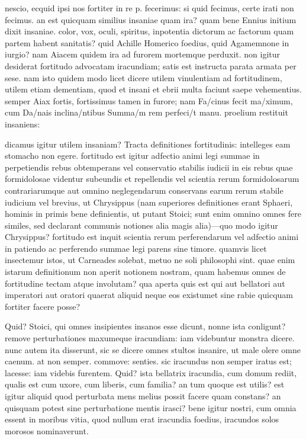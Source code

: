  nescio, ecquid ipsi nos fortiter in re p. fecerimus: si quid fecimus, certe irati non fecimus. an est quicquam similius insaniae quam ira? quam bene Ennius initium dixit insaniae. color, vox, oculi, spiritus, inpotentia dictorum ac factorum quam partem habent sanitatis? quid Achille Homerico foedius, quid Agamemnone in iurgio? nam Aiacem quidem ira ad furorem mortemque perduxit. non igitur desiderat fortitudo advocatam iracundiam; satis est instructa parata armata per sese. nam isto quidem modo licet dicere utilem vinulentiam ad fortitudinem, utilem etiam dementiam, quod et insani et ebrii multa faciunt saepe vehementius. semper Aiax fortis, fortissimus tamen in furore; nam Fa/cinus fecit ma/ximum, cum Da/nais inclina/ntibus Summa/m rem perfeci/t manu. proelium restituit insaniens:

 dicamus igitur utilem insaniam? Tracta definitiones fortitudinis: intelleges eam stomacho non egere. fortitudo est igitur adfectio animi legi summae in perpetiendis rebus obtemperans vel conservatio stabilis iudicii in eis rebus quae formidolosae videntur subeundis et repellendis vel scientia rerum formidolosarum contrariarumque aut omnino neglegendarum conservans earum rerum stabile iudicium vel brevius, ut Chrysippus (nam superiores definitiones erant Sphaeri, hominis in primis bene definientis, ut putant Stoici; sunt enim omnino omnes fere similes, sed declarant communis notiones alia magis alia)—quo modo igitur Chrysippus? fortitudo est inquit scientia rerum perferendarum vel adfectio animi in patiendo ac perferendo summae legi parens sine timore. quamvis licet insectemur istos, ut Carneades solebat, metuo ne soli philosophi sint. quae enim istarum definitionum non aperit notionem nostram, quam habemus omnes de fortitudine tectam atque involutam? qua aperta quis est qui aut bellatori aut imperatori aut oratori quaerat aliquid neque eos existumet sine rabie quicquam fortiter facere posse?

 Quid? Stoici, qui omnes insipientes insanos esse dicunt, nonne ista conligunt? remove perturbationes maxumeque iracundiam: iam videbuntur monstra dicere. nunc autem ita disserunt, sic se dicere omnes stultos insanire, ut male olere omne caenum. at non semper. commove: senties. sic iracundus non semper iratus est; lacesse: iam videbis furentem. Quid? ista bellatrix iracundia, cum domum rediit, qualis est cum uxore, cum liberis, cum familia? an tum quoque est utilis? est igitur aliquid quod perturbata mens melius possit facere quam constans? an quisquam potest sine perturbatione mentis irasci? bene igitur nostri, cum omnia essent in moribus vitia, quod nullum erat iracundia foedius, iracundos solos morosos nominaverunt.

